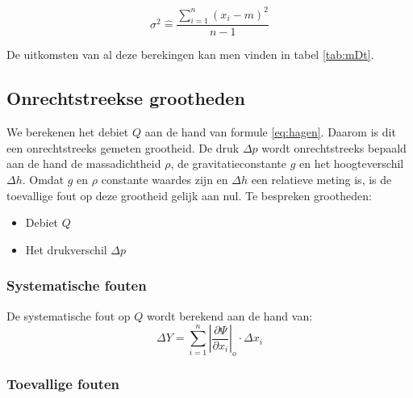 \begin{equation}
    \sigma^{2} \hat{=} \frac{\sum\limits_{i=1}^n (x_i - m)^2}{n - 1}
\end{equation}

De uitkomsten van al deze berekingen kan men vinden 
in tabel \ref{tab:mDt}.

\subsection{Onrechtstreekse grootheden}

We berekenen het debiet $Q$ aan de hand van formule \eqref{eq:hagen}. Daarom is dit een onrechtstreeks gemeten grootheid.
De druk $\Delta p$ wordt onrechtstreeks bepaald aan de hand de massadichtheid $\rho$, de gravitatieconstante $g$ en het hoogteverschil $\Delta h$. Omdat $g$ en $\rho$ constante waardes zijn en $\Delta h$ een relatieve meting is, is de toevallige fout op deze grootheid gelijk aan nul.
Te bespreken grootheden:
\begin{itemize}
    \item Debiet $Q$
    \item Het drukverschil $\Delta p$
\end{itemize}

\subsubsection{Systematische fouten}
De systematische fout op $Q$ wordt berekend aan de hand van:
\begin{equation}
    \Delta Y = \sum\limits_{i=1}^n \left|\frac{\partial \Psi}{\partial x_i}\right|_o \cdot \Delta x_i
\end{equation}

\subsubsection{Toevallige fouten}

